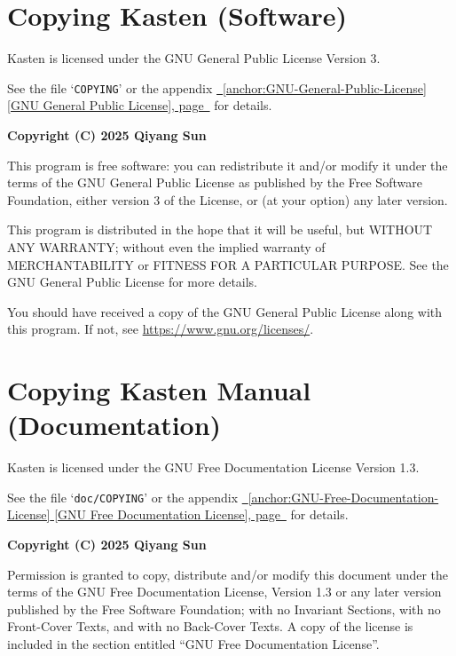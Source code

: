 \documentclass{book}
\renewcommand{\_}{\Texinfounderscore\discretionary{}{}{}}
\begin{document}
\section{{Copying Kasten (Software)}}
\label{anchor:Copying-Kasten-_0028Software_0029}%

Kasten is licensed under the GNU General Public License Version 3.

See the file `\texttt{COPYING}' or the appendix \hyperref[anchor:GNU-General-Public-License]{\chaptername~\ref*{anchor:GNU-General-Public-License} [GNU General Public License], page~\pageref*{anchor:GNU-General-Public-License}} for details.

\textbf{Copyright (C) 2025 Qiyang Sun}

This program is free software: you can redistribute it and/or modify it under
the terms of the GNU General Public License as published by the Free Software
Foundation, either version 3 of the License, or (at your option) any later
version.

This program is distributed in the hope that it will be useful, but WITHOUT ANY
WARRANTY; without even the implied warranty of MERCHANTABILITY or FITNESS FOR A
PARTICULAR PURPOSE\@. See the GNU General Public License for more details.

You should have received a copy of the GNU General Public License along with
this program. If not, see \url{https://www.gnu.org/licenses/}.

\section{{Copying Kasten Manual (Documentation)}}
\label{anchor:Copying-Kasten-Manual-_0028Documentation_0029}%

Kasten is licensed under the GNU Free Documentation License Version 1.3.

See the file `\texttt{doc/COPYING}' or the appendix \hyperref[anchor:GNU-Free-Documentation-License]{\chaptername~\ref*{anchor:GNU-Free-Documentation-License} [GNU Free Documentation License], page~\pageref*{anchor:GNU-Free-Documentation-License}} for
details.

\textbf{Copyright (C) 2025 Qiyang Sun}

Permission is granted to copy, distribute and/or modify this document under the
terms of the GNU Free Documentation License, Version 1.3 or any later version
published by the Free Software Foundation; with no Invariant Sections, with no
Front-Cover Texts, and with no Back-Cover Texts.  A copy of the license is
included in the section entitled ``GNU Free Documentation License''.
\end{document}
